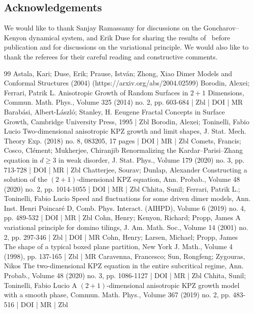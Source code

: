 \documentclass[10pt]{amsart}
\theoremstyle{definition}\newtheorem{defi}[theo]{Definition}\newtheorem{rema}[theo]{Remark}\newtheorem{exam}[theo]{Example}\newtheorem{exem}[theo]{Example}\newtheorem{nota}[theo]{Notation}
\begin{document}
\subsection*{Acknowledgements}
We would like to thank Sanjay Ramassamy for discussions on the Goncharov--Kenyon dynamical system, and Erik Duse for sharing the results of~\cite{Duse} before publication and for discussions on the variational principle. We would also like to thank the referees for their careful reading and constructive comments.




\begin{thebibliography}{99}
Astala, Kari; Duse, Erik; Prause, István; Zhong, Xiao Dimer Models and Conformal Structures (2004) (https://arxiv.org/abs/2004.02599)
Borodin, Alexei; Ferrari, Patrik L. Anisotropic Growth of Random Surfaces in $2+1$ Dimensions, Commun. Math. Phys., Volume 325 (2014) no. 2, pp. 603-684 | Zbl | DOI | MR
Barabási, Albert-László; Stanley, H. Eeugene Fractal Concepts in Surface Growth, Cambridge University Press, 1995 | Zbl
Borodin, Alexei; Toninelli, Fabio Lucio Two-dimensional anisotropic KPZ growth and limit shapes, J. Stat. Mech. Theory Exp. (2018) no. 8, 083205, 17 pages | DOI | MR | Zbl
Comets, Francis; Cosco, Clément; Mukherjee, Chiranjib Renormalizing the Kardar–Parisi–Zhang equation in $d\ge 3$ in weak disorder, J. Stat. Phys., Volume 179 (2020) no. 3, pp. 713-728 | DOI | MR | Zbl
Chatterjee, Sourav; Dunlap, Alexander Constructing a solution of the $(2+1)$-dimensional KPZ equation, Ann. Probab., Volume 48 (2020) no. 2, pp. 1014-1055 | DOI | MR | Zbl
Chhita, Sunil; Ferrari, Patrik L.; Toninelli, Fabio Lucio Speed and fluctuations for some driven dimer models, Ann. Inst. Henri Poincaré D, Comb. Phys. Interact. (AIHPD), Volume 6 (2019) no. 4, pp. 489-532 | DOI | MR | Zbl
Cohn, Henry; Kenyon, Richard; Propp, James A variational principle for domino tilings, J. Am. Math. Soc., Volume 14 (2001) no. 2, pp. 297-346 | Zbl | DOI | MR
Cohn, Henry; Larsen, Michael; Propp, James The shape of a typical boxed plane partition, New York J. Math., Volume 4 (1998), pp. 137-165 | Zbl | MR
Caravenna, Francesco; Sun, Rongfeng; Zygouras, Nikos The two-dimensional KPZ equation in the entire subcritical regime, Ann. Probab., Volume 48 (2020) no. 3, pp. 1086-1127 | DOI | MR | Zbl
Chhita, Sunil; Toninelli, Fabio Lucio A $(2+1)$-dimensional anisotropic KPZ growth model with a smooth phase, Commun. Math. Phys., Volume 367 (2019) no. 2, pp. 483-516 | DOI | MR | Zbl

\end{thebibliography}
\end{document}
